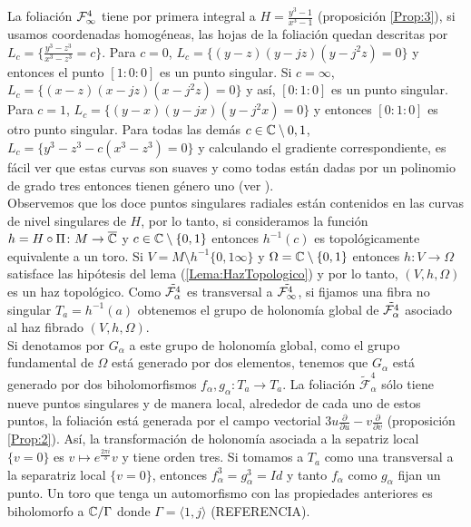 La foliación $\Fol[4]{\infty}$ tiene por primera integral a $H=\tfrac{y^{3}-1}{x^{3}-1}$ (proposición \ref{Prop:3}), si usamos coordenadas homogéneas, las hojas de la foliación quedan descritas por $L_{c}=\{\tfrac{y^{3}-z^{3}}{x^{3}-z^{3}}=c\}$. Para $c=0$, $L_{c}=\{(y-z)(y-jz)(y-j^{2}z)=0\}$ y entonces el punto $[1:0:0]$ es un punto singular. Si $c=\infty$, $L_{c}=\{(x-z)(x-jz)(x-j^{2}z)=0\}$ y así, $[0:1:0]$ es un punto singular. Para $c=1$, $L_{c}=\{(y-x)(y-jx)(y-j^{2}x)=0\}$ y entonces $[0:1:0]$ es otro punto singular. Para todas las demás $c\in\C\setminus{0,1}$, $L_{c}=\{y^{3}-z^{3}-c(x^{3}-z^{3})=0\}$ y calculando el gradiente correspondiente, es fácil ver que estas curvas son suaves y como todas están dadas por un polinomio de grado tres entonces tienen género uno (ver \cite{FischerGerd}).\\

Observemos que los doce puntos singulares radiales están contenidos en las curvas de nivel singulares de $H$, por lo tanto, si consideramos la función $h=H\circ\Pi\colon M\rightarrow\overline{\C}$ y $c\in\C\setminus\{0,1\}$ entonces $h^{-1}(c)$ es topológicamente equivalente a un toro. Si $V=M\setminus h^{-1}\{0,1\infty\}$ y $\Omega=\C\setminus\{0,1\}$ entonces $h\colon V\rightarrow\Omega$ satisface las hipótesis del lema (\ref{Lema:HazTopologico}) y por lo tanto, $(V,h,\Omega)$ es un haz topológico. Como $\tilde{\Foli_{\alpha}^{4}}$ es transversal a $\tilde{\Foli_{\infty}^{4}}$, si fijamos una fibra no singular $T_{a}=h^{-1}(a)$ obtenemos el grupo de holonomía global de $\tilde{\Foli_{\alpha}^{4}}$ asociado al haz fibrado $(V,h,\Omega)$.\\

Si denotamos por $G_{\alpha}$ a este grupo de holonomía global, como el grupo fundamental de $\Omega$ está generado por dos elementos, tenemos que $G_{\alpha}$ está generado por dos biholomorfismos $f_{\alpha},g_{\alpha}\colon T_{a}\rightarrow T_{a}$. La foliación $\tilde{\mathcal{F}}_{\alpha}^{4}$ sólo tiene nueve puntos singulares y de manera local, alrededor de cada uno de estos puntos, la foliación está generada por el campo vectorial $3u\tfrac{\partial}{\partial u}-v\tfrac{\partial}{\partial v}$ (proposición \ref{Prop:2}). Así, la transformación de holonomía asociada a la sepatriz local $\{v=0\}$ es $v\mapsto e^{\tfrac{2\pi i}{3}}v$ y tiene orden tres. Si tomamos a $T_{a}$ como una transversal a la separatriz local $\{v=0\}$, entonces $f_{\alpha}^{3}=g_{\alpha}^{3}=Id$ y tanto $f_{\alpha}$ como $g_{\alpha}$ fijan un punto. Un toro que tenga un automorfismo con las propiedades anteriores es biholomorfo a $\C/\Gamma$ donde $\Gamma=\langle 1,j\rangle$ (REFERENCIA).\\

